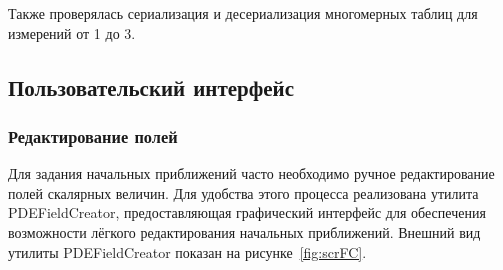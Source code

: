 Также проверялась сериализация и десериализация многомерных таблиц для 
измерений от 1 до 3.

\subsection{Пользовательский интерфейс}
\subsubsection{Редактирование полей}
Для задания начальных приближений часто необходимо ручное редактирование полей 
скалярных величин. Для удобства этого процесса реализована утилита 
PDEFieldCreator, предоставляющая графический интерфейс для обеспечения 
возможности лёгкого редактирования начальных приближений. Внешний вид утилиты 
PDEFieldCreator показан на рисунке~\ref{fig:scrFC}.

